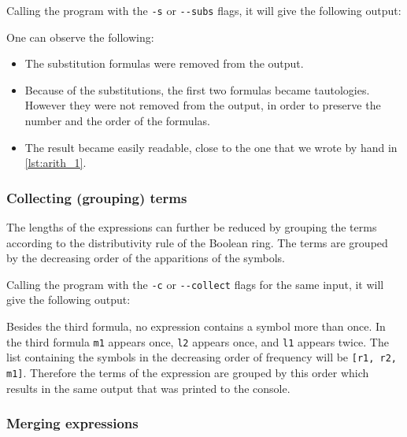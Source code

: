 

Calling the program with the \verb|-s| or \verb|--subs| flags, it will give the following output:



One can observe the following:

\begin{itemize}
\item The substitution formulas were removed from the output.

\item Because of the substitutions, the first two formulas became tautologies. However they were not removed from the output, in order to preserve the number and the order of the formulas. 

\item The result became easily readable, close to the one that we wrote by hand in \ref{lst:arith_1}. 
\end{itemize}



\subsubsection{Collecting (grouping) terms}

The lengths of the expressions can further be reduced by grouping the terms according to the distributivity rule of the Boolean ring. The terms are grouped by the decreasing order of the apparitions of the symbols.

Calling the program with the \verb|-c| or \verb|--collect| flags for the same input, it will give the following output:



Besides the third formula, no expression contains a symbol more than once. In the third formula \verb|m1| appears once, \verb|l2| appears once, and \verb|l1| appears twice. The list containing the symbols in the decreasing order of frequency will be \verb|[r1, r2, m1]|. Therefore the terms of the expression are grouped by this order which results in the same output that was printed to the console.




\subsubsection{Merging expressions}

